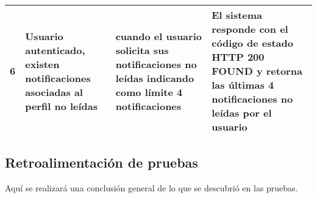 \begin{center}
\begin{longtable}{|p{0.5cm}|p{4cm}|p{4cm}|p{4.5cm}| }
6& Usuario autenticado, existen notificaciones asociadas al perfil no leídas & cuando el usuario solicita sus notificaciones no leídas indicando como límite 4 notificaciones & El sistema responde con el código de estado HTTP 200 FOUND y retorna las últimas 4 notificaciones no leídas por el usuario\\ \hline


  \end{longtable}
\end{center}





\subsection{Retroalimentación de pruebas}
Aquí se realizará una conclusión general de lo que se descubrió en las pruebas.
